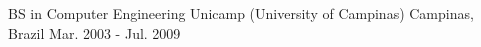 

\begin{cventries}

  \cventry
    {BS in Computer Engineering} %
    {Unicamp (University of Campinas)} %
    {Campinas, Brazil} %
    {Mar. 2003 - Jul. 2009} %
    {}

\end{cventries}
